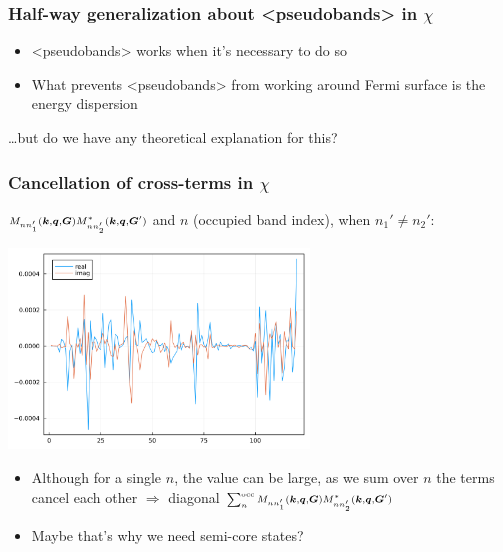 \documentclass[t]{beamer}
\newcommand{\shortcode}[1]{\texttt{#1}}
\def\texttt#1{<#1>}%
\begin{document}
\begin{frame}
\frametitle{Half-way generalization about \shortcode{pseudobands} in $\chi$}

\begin{itemize}
    \item[\faHandPointRight] \shortcode{pseudobands} works  
    when it's necessary to do so 
    \item[\faHandPointRight] What prevents \shortcode{pseudobands} from working 
    around Fermi surface is the energy dispersion
\end{itemize}

\vspace{0.5cm}

\dots but do we have any theoretical explanation for this?

\end{frame}

\begin{frame}
\frametitle{Cancellation of cross-terms in $\chi$}

$\scriptstyle M_{n n'_1} (\vb*{k}, \vb*{q}, \vb*{G}) M^*_{nn'_2} (\vb*{k}, \vb*{q}, \vb*{G}')$ and $n$ (occupied band index), when $n_1' \neq n_2'$:
\begin{center}
    \includegraphics[width=0.6\textwidth]{../data/chi/nc-n1-2000-n2-1000-nv-1-120-k_idx-12-q_idx-37-G_idx-200.png}
\end{center}

\begin{itemize}
    \item[\faHandPointRight] Although for a single $n$, the value can be large, 
    as we sum over $n$ the terms cancel each other $\Rightarrow$
    diagonal $\scriptstyle \sum_{n}^{\text{occ}} M_{n n'_1} (\vb*{k}, \vb*{q}, \vb*{G}) M^*_{nn'_2} (\vb*{k}, \vb*{q}, \vb*{G}')$ 
    \item Maybe that's why we need semi-core states?
\end{itemize}

\end{frame}
\end{document}
